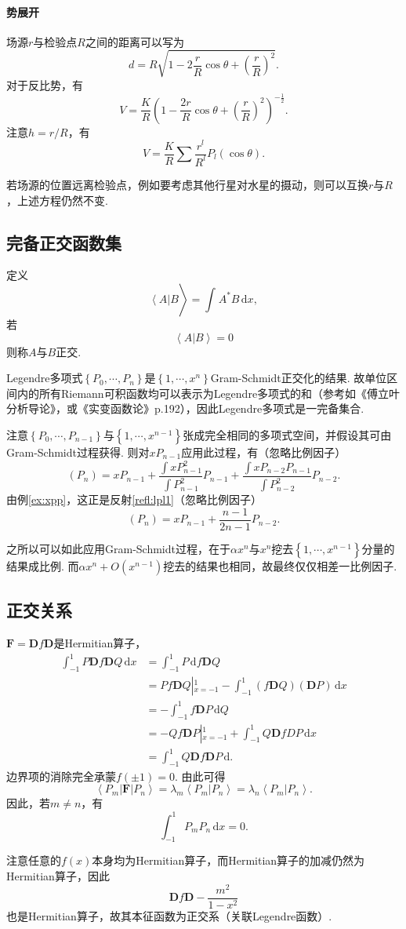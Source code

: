 \documentclass[UTF-8]{ctexart}
\newcommand{\dr}{\mathrm{d}}
\newcommand{\pare}[1]{\left(#1\right)}
\newcommand{\half}{\frac{1}{2}}
\newcommand{\intab}[4]{\int_{#1}^{#2} #3 \, \dr #4}
\newcommand{\DD}{\mathbf{D}}
\newcommand{\FF}{\mathbf{F}}
\newcommand{\bk}[3]{\left\langle#1\right\vert#2\left\vert#3\right\rangle}
\newcommand{\blk}[2]{\left\langle#1\right\vert#2\left.\right\rangle}
\newcommand{\brac}[1]{\left\{ #1 \right\}}
\newcommand{\rref}[1]{反射\ref{refl:#1}}
\newcommand{\eref}[1]{例\ref{ex:#1}}
\begin{document}
  \paragraph{势展开}场源$r$与检验点$R$之间的距离可以写为
  \[ d = R\sqrt{1-2\frac{r}{R}\cos\theta+\pare{\frac{r}{R}}^2}. \]
  对于反比势，有
  \[ V = \frac{K}{R}\pare{1-\frac{2r}{R}\cos\theta+\pare{\frac{r}{R}}^2}^{-\half}. \]
  注意$h=r/R$，有
  \[ V = \frac{K}{R} \sum \frac{r^l}{R^l}P_l\pare{\cos\theta}. \]
  \par
  若场源的位置远离检验点，例如要考虑其他行星对水星的摄动，则可以互换$r$与$R$，上述方程仍然不变.
  \subsection{完备正交函数集}
  定义
  \[ \blk{A}{B} = \intab{}{}{A^*B}{x}, \]
  若
  \[ \blk{A}{B} = 0 \]
  则称$A$与$B$正交.
  \par
  Legendre多项式$\brac{P_0,\cdots,P_{n}}$是$\brac{1,\cdots,x^{n}}$Gram-Schmidt正交化的结果. 故单位区间内的所有Riemann可积函数均可以表示为Legendre多项式的和（参考如《傅立叶分析导论》，或《实变函数论》p.192），因此Legendre多项式是一完备集合.
  \par
  注意$\brac{P_0,\cdots,P_{n-1}}$与$\brac{1,\cdots,x^{n-1}}$张成完全相同的多项式空间，并假设其可由Gram-Schmidt过程获得. 则对$xP_{n-1}$应用此过程，有（忽略比例因子）
  \[ \pare{P_n} = xP_{n-1} + \frac{\int xP_{n-1}^2}{\int P_{n-1}^2}P_{n-1} + \frac{\int x P_{n-2}P_{n-1}}{\int P_{n-2}^2}P_{n-2}. \]
  由\eref{xpp}，这正是\rref{lpl1}（忽略比例因子）
  \[ \pare{P_n} = xP_{n-1} + \frac{n-1}{2n-1}P_{n-2}. \]
  \par
  之所以可以如此应用Gram-Schmidt过程，在于$\alpha x^n$与$x^n$挖去$\brac{1,\cdots,x^{n-1}}$分量的结果成比例. 而$\alpha x^n + O\pare{x^{n-1}}$挖去的结果也相同，故最终仅仅相差一比例因子.
  \subsection{正交关系}
  \label{sssec:oth}
  $\FF = \DD f\DD$是Hermitian算子，
  \begin{align*}
    \intab{-1}{1}{P\DD f\DD Q}{x} &= \intab{-1}{1}{P}{f\DD Q} \\
    &= Pf\DD Q\left\vert_{x=-1}^{1} - \intab{-1}{1}{\pare{f\DD Q}\pare{\DD P}}{x} \right. \\
    &= -\intab{-1}{1}{f\DD P}{Q} \\
    &= -Qf\DD P\left\vert_{x=-1}^{1} + \intab{-1}{1}{Q\DD fDP}{x}\right. \\
    &= \intab{-1}{1}{Q\DD f\DD P}.
  \end{align*}
  边界项的消除完全承蒙$f\pare{\pm1}=0$. 由此可得
  \[ \bk{P_m}{\FF}{P_n} = \lambda_m\blk{P_m}{P_n} = \lambda_n\blk{P_m}{P_n}. \]
  因此，若$m\ne n$，有
  \[ \intab{-1}{1}{P_mP_n}{x} = 0. \]
  \par
  注意任意的$f\pare{x}$本身均为Hermitian算子，而Hermitian算子的加减仍然为Hermitian算子，因此
  \[ \DD f \DD - \frac{m^2}{1-x^2} \]
  也是Hermitian算子，故其本征函数为正交系（关联Legendre函数）.
\end{document}
